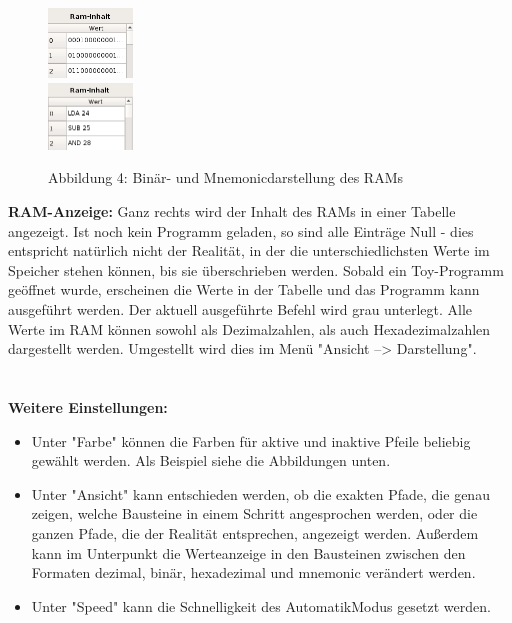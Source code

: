 \documentclass{article}
\begin{document}
\begin{figure}
    \centering \includegraphics[width=0.2\textwidth]{./picture_ramBinary.png}\\
    \vspace{.1cm}
    \centering \includegraphics[width=0.2\textwidth]{./picture_ramAssembly.png}\\
    \caption*{Abbildung 4: Binär- und Mnemonicdarstellung des RAMs}
\end{figure}
\noindent \textbf{RAM-Anzeige:}
Ganz rechts wird der Inhalt des RAMs in einer Tabelle angezeigt. Ist noch kein Programm geladen, so sind alle Einträge Null - dies entspricht natürlich nicht der
Realität, in der die unterschiedlichsten Werte im Speicher stehen können, bis sie überschrieben werden. Sobald ein Toy-Programm geöffnet wurde, erscheinen die
Werte in der Tabelle und das Programm kann ausgeführt werden. Der aktuell ausgeführte Befehl wird grau unterlegt. Alle Werte im RAM können sowohl als Dezimalzahlen,
als auch Hexadezimalzahlen dargestellt werden. Umgestellt wird dies im Menü "Ansicht --> Darstellung".\\\\\\

\noindent \textbf{Weitere Einstellungen:}
\begin{itemize}
    \item   Unter "Farbe" können die Farben für aktive und inaktive Pfeile beliebig gewählt werden. Als Beispiel siehe die Abbildungen unten.
    \item   Unter "Ansicht" kann entschieden werden, ob die exakten Pfade, die genau zeigen, welche Bausteine in einem Schritt angesprochen werden, oder die
            ganzen Pfade, die der Realität entsprechen, angezeigt werden. Außerdem kann im Unterpunkt die Werteanzeige in den Bausteinen zwischen den Formaten dezimal, binär,
            hexadezimal und mnemonic verändert werden.
    \item   Unter "Speed" kann die Schnelligkeit des AutomatikModus gesetzt werden.
\end{itemize}
\end{document}
